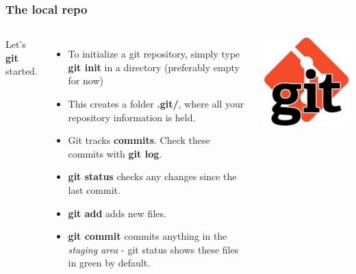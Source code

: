 \documentclass{beamer}
\begin{document}
\begin{frame}[fragile]
\frametitle{The local repo}
\begin{columns}
Let's \textbf{git} started.
\begin{itemize}
\item To initialize a git repository, simply type \textbf{git init} in a directory (preferably empty for now)
\item This creates a folder \textbf{.git/}, where all your repository information is held.
\item Git tracks \textbf{commits}. Check these commits with \textbf{git log}.
\item \textbf{git status} checks any changes since the last commit.
\item \textbf{git add} adds new files.
\item \textbf{git commit} commits anything in the \textit{staging area} - git status shows these files in {\color{dkgreen}green} by default.
\end{itemize}
\includegraphics[width=\textwidth]{git.jpg}
\end{columns}
\end{frame}
\end{document}
